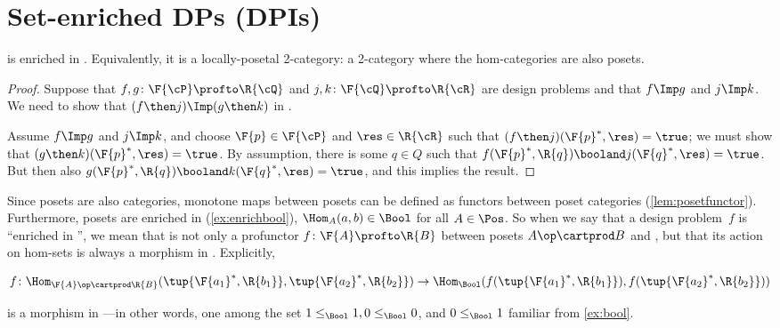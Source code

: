 
\section{Set-enriched DPs (DPIs)}

\begin{proposition}
	\label{prop:DP_loc_pos}
	\DP is enriched in \Pos.
	Equivalently, it is a locally-posetal 2-category: a 2-category where the hom-categories are also posets.
\end{proposition}
\begin{proof}
	Suppose that $f,g\colon \F{\cP} \profto \R{\cQ}$ and $j,k\colon \F{\cQ} \profto \R{\cR}$ are design problems and that $f\Imp g$ and $j\Imp k$.
	We need to show that $(f\then j)\Imp(g\then k)$ in \DP.
	\begin{center}
	\end{center}
	Assume $f\Imp g$ and $j\Imp k$, and choose $\F{p}\in\F{\cP} $ and $\res\in\R{\cR}$ such that $(f\then j)(\F{p}^*,\res)=\true$; we must show that $(g \then k)(\F{p}^*,\res)=\true$.
	By assumption, there is some $q\in Q$ such that $f(\F{p}^*,\R{q})\booland j(\F{q}^*,\res)=\true$.
	But then also $g(\F{p}^*,\R{q})\booland k(\F{q}^*,\res)=\true$, and this implies the result.
\end{proof}
Since posets are also categories, monotone maps between posets can be defined as functors between poset categories (\cref{lem:posetfunctor}).
Furthermore, posets are enriched in \Bool (\cref{ex:enrichbool}), \ie $\Hom_A(a,b) \in \Bool$ for all $A \in \Pos$.
So when we say that a design problem~$f$ is ``enriched in \Bool'', we mean that is not only a profunctor $f \colon \F{A} \profto \R{B}$ between posets $A\op \cartprod B$ and \Bool, but that its action on hom-sets is always a morphism in \Bool.
Explicitly,

\begin{widepar}
	\begin{equation*}
		f \colon \Hom_{\F{A}\op \cartprod \R{B}}(\tup{\F{a_1}^*,\R{b_1}}, \tup{\F{a_2}^*,\R{b_2}}) \to \Hom_\Bool(f(\tup{\F{a_1}^*,\R{b_1}}), f(\tup{\F{a_2}^*,\R{b_2}}))
	\end{equation*}
\end{widepar}
is a morphism in \Bool---in other words, one among the set $1 \leq_\Bool 1, 0 \leq_\Bool 0$, and $0 \leq_\Bool 1$ familiar from \cref{ex:bool}.

